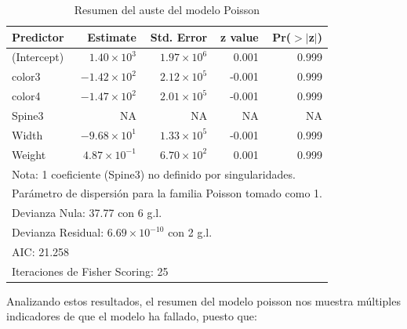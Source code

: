 \begin{table}[H]
\centering
\caption{Resumen del auste del modelo Poisson}
\label{tab:poisson_summary_invalid}
\begin{tabular}{lrrrr}
\hline
\textbf{Predictor} & \textbf{Estimate} & \textbf{Std. Error} & \textbf{z value} & \textbf{Pr($>$$|$z$|$)} \\
\hline
(Intercept) & $1.40 \times 10^{3}$  & $1.97 \times 10^{6}$  & 0.001 & 0.999 \\
color3      & $-1.42 \times 10^{2}$ & $2.12 \times 10^{5}$  & -0.001 & 0.999 \\
color4      & $-1.47 \times 10^{2}$ & $2.01 \times 10^{5}$  & -0.001 & 0.999 \\
Spine3      & NA                    & NA                    & NA    & NA    \\
Width       & $-9.68 \times 10^{1}$ & $1.33 \times 10^{5}$  & -0.001 & 0.999 \\
Weight      & $4.87 \times 10^{-1}$ & $6.70 \times 10^{2}$  & 0.001 & 0.999 \\
\hline
\multicolumn{5}{l}{\footnotesize Nota: 1 coeficiente (Spine3) no definido por singularidades.} \\
\multicolumn{5}{l}{\footnotesize Parámetro de dispersión para la familia Poisson tomado como 1.} \\
\multicolumn{5}{l}{\footnotesize Devianza Nula: 37.77 con 6 g.l.} \\
\multicolumn{5}{l}{\footnotesize Devianza Residual: $6.69 \times 10^{-10}$ con 2 g.l.} \\
\multicolumn{5}{l}{\footnotesize AIC: 21.258} \\
\multicolumn{5}{l}{\footnotesize Iteraciones de Fisher Scoring: 25} \\
\end{tabular}
\end{table}


Analizando estos resultados, el resumen del modelo poisson nos muestra múltiples indicadores de que el modelo ha fallado, puesto que:

